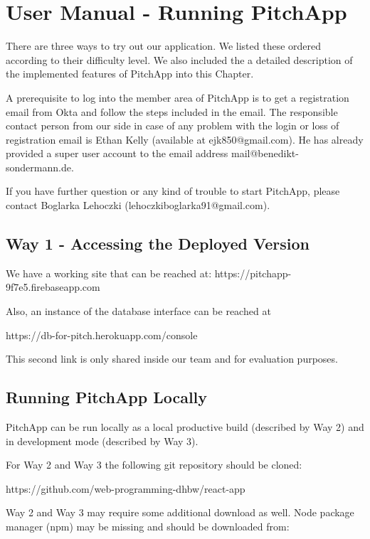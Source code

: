 \chapter{User Manual - Running PitchApp}


There are three ways to try out our application. We listed these ordered according to their difficulty level. We also included the a detailed description of the implemented features of PitchApp into this Chapter.

A prerequisite to log into the member area of PitchApp is to get a registration email from Okta and follow the steps included in the email. The responsible contact person from our side in case of any problem with the login or loss of registration email is Ethan Kelly (available at ejk850@gmail.com). He has already provided a super user account to the email address mail@benedikt-sondermann.de.

If you have further question or any kind of trouble to start PitchApp, please contact Boglarka Lehoczki (lehoczkiboglarka91@gmail.com).

\section{Way 1 - Accessing the Deployed Version}

We have a working site that can be reached at: https://pitchapp-9f7e5.firebaseapp.com

Also, an instance of the database interface can be reached at

https://db-for-pitch.herokuapp.com/console

This second link is only shared inside our team and for evaluation purposes.

\section{Running PitchApp Locally}

PitchApp can be run locally as a local productive build (described by Way 2) and in development mode (described by Way 3).

For Way 2 and Way 3 the following git repository should be cloned:

https://github.com/web-programming-dhbw/react-app

Way 2 and Way 3 may require some additional download as well.
Node package manager (npm) may be missing and should be downloaded from:


